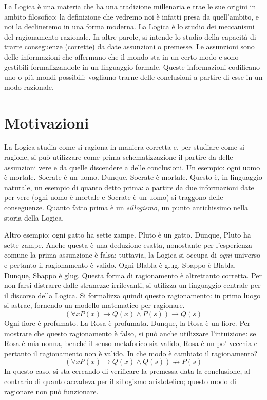 La Logica è una materia che ha una tradizione millenaria e trae le sue 
origini in ambito filosofico: la definizione che vedremo noi è infatti 
presa da quell'ambito, e noi la declineremo in una forma moderna. 
La Logica è lo studio dei meccanismi del ragionamento razionale. 
In altre parole, si intende lo studio della capacità di trarre conseguenze 
(corrette) da date assunzioni o premesse. Le assunzioni sono delle informazioni 
che affermano che il mondo sta in un certo modo e sono gestibili formalizzandole 
in un linguaggio formale. Queste informazioni codificano uno o più mondi possibili: 
vogliamo trarne delle conclusioni a partire di esse in un modo razionale. 

\section{Motivazioni}
La Logica studia come si ragiona in maniera corretta e, per studiare come 
si ragione, si può utilizzare come prima schematizzazione il partire da delle 
assunzioni vere e da quelle discendere a delle conclusioni. 
Un esempio: ogni uomo è mortale. Socrate è un uomo. 
Dunque, Socrate è mortale. Questo è, in linguaggio naturale, un esempio di quanto 
detto prima: a partire da due informazioni date per vere (ogni uomo è mortale e 
Socrate è un uomo) si traggono delle conseguenze. Quanto fatto prima è un 
\textit{sillogismo}, un punto antichissimo nella storia della Logica.

Altro esempio: ogni gatto ha sette zampe. Pluto è un gatto. Dunque, Pluto 
ha sette zampe. Anche questa è una deduzione esatta, nonostante per l'esperienza 
comune la prima assunzione è falsa; tuttavia, la Logica si occupa di \textit{ogni}
universo e pertanto il ragionamento è valido. 
Ogni Blabla è glug. Sbappo è Blabla. Dunque, Sbappo è glug. Questa forma di 
ragionamento è altrettanto corretta. 
Per non farsi distrarre dalle stranezze irrilevanti, si utilizza un linguaggio 
centrale per il discorso della Logica. Si formalizza quindi questo ragionamento: 
in primo luogo si astrae, fornendo un modello matematico per ragionare.
$$
(\forall x P(x) \rightarrow Q(x) \land P(s)) \rightarrow Q(s)
$$
Ogni fiore è profumato. La Rosa è profumata. Dunque, la Rosa è un fiore. 
Per mostrare che questo ragionamento è falso, si può anche utilizzare l'intuizione: 
se Rosa è mia nonna, benché il senso metaforico sia valido, Rosa è un po' vecchia 
e pertanto il ragionamento non è valido. In che modo è cambiato il ragionamento? 
$$
(\forall x P(x) \rightarrow Q(x) \land Q(s)) \nrightarrow P(s)
$$
In questo caso, si sta cercando di verificare la premessa data la conclusione, 
al contrario di quanto accadeva per il sillogismo aristotelico; questo modo 
di ragionare non può funzionare. 

